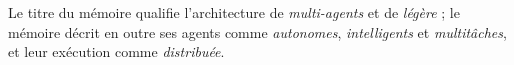 
Le titre du mémoire qualifie l'architecture de \textit{multi-agents} et de \textit{légère} ; le mémoire décrit en outre ses agents comme \textit{autonomes}, \textit{intelligents} et \textit{multitâches}, et leur exécution comme \textit{distribuée}.
